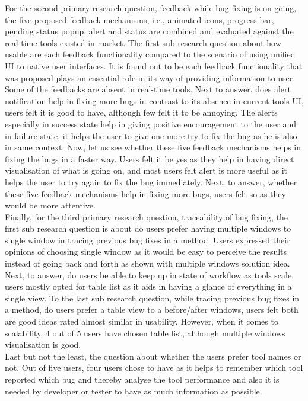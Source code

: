 For the second primary research question, feedback while bug fixing is on-going, the five proposed feedback mechanisms, i.e., animated icons, progress bar, pending status popup, alert and status are combined and evaluated against the real-time tools existed in market. The first sub research question about how usable are each feedback functionality compared to the scenario of using unified UI to native user interfaces. It is found out to be each feedback functionality that was proposed plays an essential role in its way of providing information to user. Some of the feedbacks are absent in real-time tools. Next to answer, does alert notification help in fixing more bugs in contrast to its absence in current tools UI, users felt it is good to have, although few felt it to be annoying. The alerts especially in success state help in giving positive encouragement to the user and in failure state, it helps the user to give one more try to fix the bug as he is also in same context. Now, let us see whether these five feedback mechanisms helps in fixing the bugs in a faster way. Users felt it be yes as they help in having direct visualisation of what is going on, and most users felt alert is more useful as it helps the user to try again to fix the bug immediately. Next, to answer, whether these five feedback mechanisms help in fixing more bugs, users felt so as they would be more attentive. \\

Finally, for the third primary research question, traceability of bug fixing, the first sub research question is about do users prefer having multiple windows to single window in tracing previous bug fixes in a method. Users expressed their opinions of choosing single window as it would be easy to perceive the results instead of going back and forth as shown with multiple windows solution idea.  Next, to answer, do users be able to keep up in state of workflow as tools scale, users mostly opted for table list as it aids in having a glance of everything in a single view. To the last sub research question, while tracing previous bug fixes in a method, do users prefer a table view to a before/after windows, users felt both are good ideas rated almost similar in usability. However, when it comes to scalability, 4 out of 5 users have chosen table list, although multiple windows visualisation is good. \\

Last but not the least, the question about whether the users prefer tool names or not. Out of five users, four users chose to have as it helps to remember which tool reported which bug and thereby analyse the tool performance and also it is needed by developer or tester to have as much information as possible. \\

